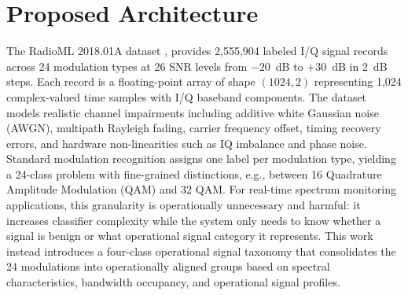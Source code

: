 \documentclass[conference]{IEEEtran}
\begin{document}
\section{Proposed Architecture}
The RadioML 2018.01A dataset \cite{b3}, provides 2,555,904 labeled I/Q signal records across 24 modulation types at 26 SNR levels from $-20$~dB to $+30$~dB in 2~dB steps. Each record is a floating-point array of shape $(1024, 2)$ representing 1,024 complex-valued time samples with I/Q baseband components. The dataset models realistic channel impairments including additive white Gaussian noise (AWGN), multipath Rayleigh fading, carrier frequency offset, timing recovery errors, and hardware non-linearities such as IQ imbalance and phase noise.
Standard modulation recognition assigns one label per modulation type, yielding a 24-class problem with fine-grained distinctions, e.g., between 16 Quadrature Amplitude Modulation (QAM) and 32 QAM. For real-time spectrum monitoring applications, this granularity is operationally unnecessary and harmful: it increases classifier complexity while the system only needs to know whether a signal is benign or what operational signal category it represents. This work instead introduces a four-class operational signal taxonomy that consolidates the 24 modulations into operationally aligned groups based on spectral characteristics, bandwidth occupancy, and operational signal profiles.
\end{document}
